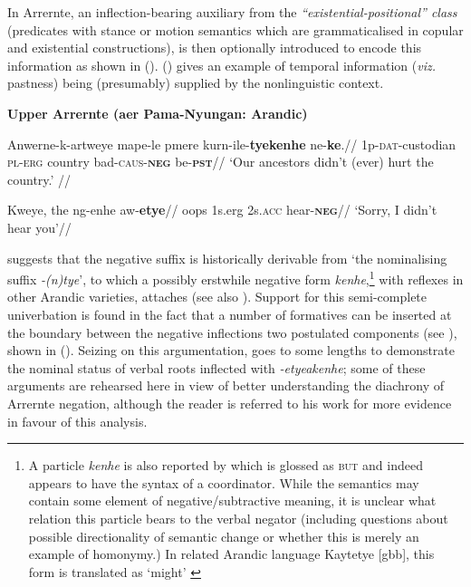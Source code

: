 In Arrernte, an inflection-bearing auxiliary from the \textit{``existential-positional'' class} (predicates with stance or motion semantics which are grammaticalised in copular and existential constructions), is then optionally introduced to encode this information as shown in (). () gives an example of temporal information (\textit{viz.} pastness) being (presumably) supplied by the nonlinguistic context.

\pex\label{sn-aec} \textbf{Upper Arrernte (\gls{aer} Pama-Nyungan: Arandic)}

\a\begingl \gla Anwerne-k-artweye mape-le pmere kurn-ile-\textbf{tyekenhe} ne-\textbf{ke}.//
\glb 1p\textsc{-dat-}custodian \textsc{pl-erg} country bad\textsc{-caus-\textbf{neg}} be-\textsc{\textbf{pst}}//
\glft`Our ancestors didn't (ever) hurt the country.' //\endgl



\a\begingl\gla Kweye, the ng-enhe aw-\textbf{etye}//
\glb oops 1s.\gls{erg} 2s.\textsc{acc} hear-\textbf{\textsc{neg}}//
\glft`Sorry, I didn't hear you'//\endgl

\xe

\citet[235, fn 17]{Wilkins1989} suggests that the negative suffix is historically derivable from `the nominalising suffix \textit{-(n)tye}', to which a possibly erstwhile negative form \textit{kenhe},\footnote{A particle \textit{kenhe} is also reported by \citet[372]{Wilkins1989} which is glossed as \textsc{but} and indeed appears to have the syntax of a coordinator. While the semantics may contain some element of negative/subtractive meaning, it is unclear what relation this particle bears to the verbal negator (including questions about possible directionality of semantic change or whether this is merely an example of homonymy.) In related Arandic language Kaytetye [\gls{gbb}], this form is translated as `might' \citep[424]{KaytetyeDict}} with reflexes in other Arandic varieties, attaches (see also \citealt[275]{Yallop1977}). Support for this semi-complete univerbation is found in the fact that a number of formatives can be inserted at the boundary between the negative inflections two postulated components (see \citealt[378\textit{ff}]{Wilkins1989}), shown in (). Seizing on this argumentation, \citet[411-26]{Henderson2013} goes to some lengths to demonstrate the nominal status of verbal roots inflected with \textit{-etye\textdblhyphen akenhe}; some of these arguments are rehearsed here in view of better understanding the diachrony of Arrernte negation, although the reader is referred to his work for more evidence in favour of this analysis.

